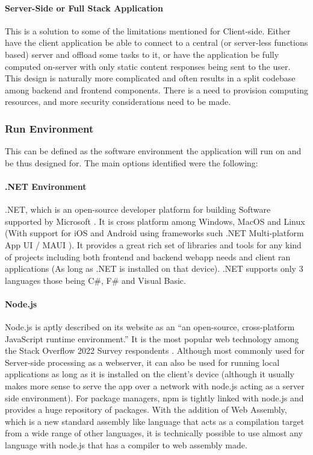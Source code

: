 \paragraph{Server-Side or Full Stack Application}
This is a solution to some of the limitations mentioned for Client-side. Either have the client application be able to connect to a central (or server-less functions based) server and offload some tasks to it, or have the application be fully computed on-server with only static content responses being sent to the user. This design is naturally more complicated and often results in a split codebase among backend and frontend components. There is a need to provision computing resources, and more security considerations need to be made.

\subsubsection{Run Environment}
This can be defined as the software environment the application will run on and be thus designed for. The main options identified were the following:

\paragraph{.NET Environment}
.NET, which is an open-source developer platform for building Software supported by Microsoft \cite[]{microsoft_what}. It is cross platform among Windows, MacOS and Linux (With support for iOS and Android using frameworks such .NET Multi-platform App UI / MAUI \cite[]{davidbritch_what}). It provides a great rich set of libraries and tools for any kind of projects including both frontend and backend webapp needs and client ran applications (As long as .NET is installed on that device). .NET supports only 3 languages those being C\#, F\# and Visual Basic.

\paragraph{Node.js}
Node.js is aptly described on its website as an “an open-source, cross-platform JavaScript runtime environment.” \cite[]{nodejs_nodejs} It is the most popular web technology among the Stack Overflow 2022 Survey respondents \cite[]{stackoverflow_2021_stack}. Although most commonly used for Server-side processing as a webserver, it can also be used for running local applications as long as it is installed on the client’s device (although it usually makes more sense to serve the app over a network with node.js acting as a server side environment). For package managers, npm is tightly linked with node.js and provides a huge repository of packages. With the addition of Web Assembly, which is a new standard assembly like language that acts as a compilation target from a wide range of other languages, it is technically possible to use almost any language with node.js that has a compiler to web assembly made. \cite[]{webassembly}

